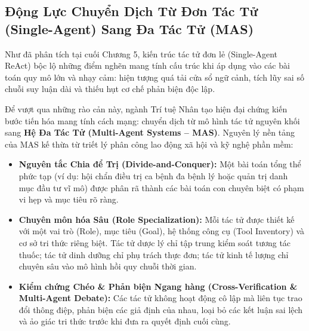 \documentclass[12pt,a4paper]{report}
\begin{document}
\subsection{Động Lực Chuyển Dịch Từ Đơn Tác Tử (Single-Agent) Sang Đa Tác Tử (MAS)}
Như đã phân tích tại cuối Chương 5, kiến trúc tác tử đơn lẻ (Single-Agent ReAct) bộc lộ những điểm nghẽn mang tính cấu trúc khi áp dụng vào các bài toán quy mô lớn và nhạy cảm: hiện tượng quá tải cửa sổ ngữ cảnh, tích lũy sai số chuỗi suy luận dài và thiếu hụt cơ chế phản biện độc lập. 

Để vượt qua những rào cản này, ngành Trí tuệ Nhân tạo hiện đại chứng kiến bước tiến hóa mang tính cách mạng: chuyển dịch từ mô hình tác tử nguyên khối sang \textbf{Hệ Đa Tác Tử (Multi-Agent Systems -- MAS)}. Nguyên lý nền tảng của MAS kế thừa từ triết lý phân công lao động xã hội và kỹ nghệ phần mềm:
\begin{itemize}[leftmargin=1.2cm]
    \item \textbf{Nguyên tắc Chia để Trị (Divide-and-Conquer):} Một bài toán tổng thể phức tạp (ví dụ: hội chẩn điều trị ca bệnh đa bệnh lý hoặc quản trị danh mục đầu tư vĩ mô) được phân rã thành các bài toán con chuyên biệt có phạm vi hẹp và mục tiêu rõ ràng.
    \item \textbf{Chuyên môn hóa Sâu (Role Specialization):} Mỗi tác tử được thiết kế với một vai trò (Role), mục tiêu (Goal), hệ thống công cụ (Tool Inventory) và cơ sở tri thức riêng biệt. Tác tử dược lý chỉ tập trung kiểm soát tương tác thuốc; tác tử dinh dưỡng chỉ phụ trách thực đơn; tác tử kinh tế lượng chỉ chuyên sâu vào mô hình hồi quy chuỗi thời gian.
    \item \textbf{Kiểm chứng Chéo \& Phản biện Ngang hàng (Cross-Verification \& Multi-Agent Debate):} Các tác tử không hoạt động cô lập mà liên tục trao đổi thông điệp, phản biện các giả định của nhau, loại bỏ các kết luận sai lệch và ảo giác tri thức trước khi đưa ra quyết định cuối cùng.
\end{itemize}
\end{document}
